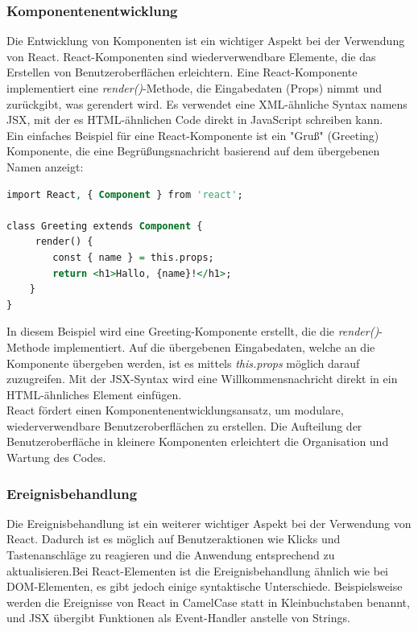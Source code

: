 \subsubsection{Komponentenentwicklung}
Die Entwicklung von Komponenten ist ein wichtiger Aspekt bei der Verwendung von React. React-Komponenten sind wiederverwendbare Elemente, die das Erstellen von Benutzeroberflächen erleichtern. Eine React-Komponente implementiert eine \emph{render()}-Methode, die Eingabedaten (Props) nimmt und zurückgibt, was gerendert wird. Es verwendet eine XML-ähnliche Syntax namens JSX, mit der es HTML-ähnlichen Code direkt in JavaScript schreiben kann.\cite{deLegacyReactjs}\\
Ein einfaches Beispiel für eine React-Komponente ist ein "Gruß" (Greeting) Komponente, die eine Begrüßungsnachricht basierend auf dem übergebenen Namen anzeigt:
\begin{lstlisting}[language=vhdl,
	frame=single,           % Ein Rahmen um den Code
	framexleftmargin=15pt,  % Rahmen link von den Zahlen
	style=algoBericht,
	label={Greeting-Komponente},
	captionpos=b ,          % Caption unter den Code setzen
	caption={Beispiel Komponentenentwicklung }]
import React, { Component } from 'react';

class Greeting extends Component {
     render() {
        const { name } = this.props;
        return <h1>Hallo, {name}!</h1>;
    }
}
\end{lstlisting}
In diesem Beispiel wird eine Greeting-Komponente erstellt, die die \emph{render()}-Methode implementiert. Auf die übergebenen Eingabedaten, welche an die Komponente übergeben werden, ist es mittels \emph{this.props} möglich darauf zuzugreifen\cite{deLegacyReactjs}. Mit der JSX-Syntax wird eine Willkommensnachricht direkt in ein HTML-ähnliches Element einfügen. \\

React fördert einen Komponentenentwicklungsansatz, um modulare, wiederverwendbare Benutzeroberflächen zu erstellen. Die Aufteilung der Benutzeroberfläche in kleinere Komponenten erleichtert die Organisation und Wartung des Codes.

\subsubsection{Ereignisbehandlung}
Die Ereignisbehandlung ist ein weiterer wichtiger Aspekt bei der Verwendung von React. Dadurch ist es möglich auf Benutzeraktionen wie Klicks und Tastenanschläge zu reagieren und die Anwendung entsprechend zu aktualisieren.Bei React-Elementen ist die Ereignisbehandlung ähnlich wie bei DOM-Elementen, es gibt jedoch einige syntaktische Unterschiede. Beispielsweise werden die Ereignisse von React in CamelCase statt in Kleinbuchstaben benannt, und JSX übergibt Funktionen als Event-Handler anstelle von Strings.\cite{react_de_handling_events}


